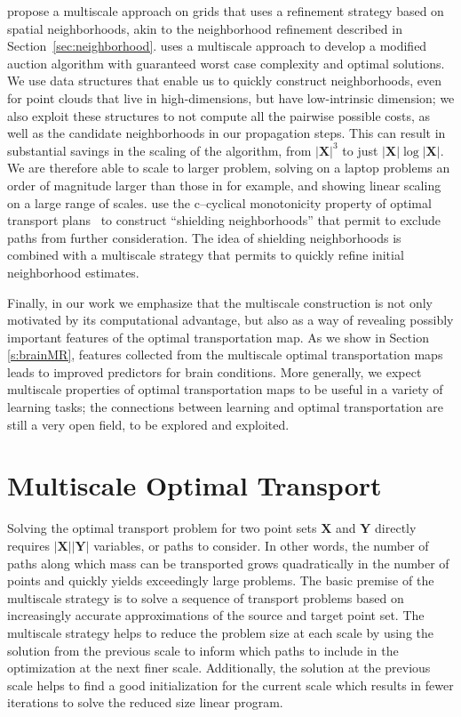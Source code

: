 \documentclass[twoside,11pt]{article}
\newcommand{\Xsp}{{\mathbf{X}}}
\newcommand{\Ysp}{{\mathbf{Y}}}
\begin{document}
\citet{schmitzer2013hierarchical} propose a multiscale approach on grids that
uses a refinement strategy based on spatial neighborhoods, akin to the
neighborhood refinement described in Section~\ref{sec:neighborhood}.
\citet{schmitzer2015sparse} uses a multiscale approach to develop a modified
auction algorithm with guaranteed worst case complexity and optimal solutions.
We use data structures that enable us to quickly construct neighborhoods, even
for point clouds that live in high-dimensions, but have low-intrinsic dimension;
we also exploit these structures to not compute all the pairwise possible
costs, as well as the candidate neighborhoods in our propagation steps. This
can result in substantial savings in the scaling of the algorithm, from
$|\mathbf{X}|^3$ to just $|\mathbf{X}|\log|\mathbf{X}|$. We are therefore able
to scale to larger problem, solving on a laptop problems an order of magnitude
larger than those in \citet{oberman2015efficient} for example, and showing
linear scaling on a large range of scales.  \citet{schmitzer2015sparse} use the
c--cyclical monotonicity property of optimal transport
plans~\citep[Chapter~5]{villani:book2009} to construct ``shielding
neighborhoods'' that permit to exclude paths from further consideration. The
idea of shielding neighborhoods is combined with a multiscale strategy that
permits to quickly refine initial neighborhood estimates. 

Finally, in our work we emphasize that the multiscale construction is not only
motivated by its computational advantage, but also as a way of revealing
possibly important features of the optimal transportation map. As we show in
Section \ref{s:brainMR}, features collected from the multiscale optimal
transportation maps leads to improved predictors for brain conditions. More
generally, we expect multiscale properties of optimal transportation maps to be
useful in a variety of learning tasks; the connections between learning and
optimal transportation are still a very open field, to be explored and
exploited.


\section{Multiscale Optimal Transport}
\label{sec:mdop}
Solving the optimal transport problem for two point sets $\Xsp$ and $\Ysp$
directly requires $|\Xsp||\Ysp|$ variables, or paths to consider. In other
words, the number of paths along which mass can be transported grows
quadratically in the number of points and quickly yields exceedingly large
problems.  The basic premise of the multiscale strategy is to solve a sequence
of transport problems based on increasingly accurate approximations of the
source and target point set. The  multiscale strategy helps to reduce the
problem size at each scale by using the solution from the previous scale to
inform which paths to include in the optimization at the next finer scale.
Additionally, the solution at the previous scale helps to find a good
initialization for the current scale which results in fewer iterations to solve
the reduced size linear program.
\end{document}
